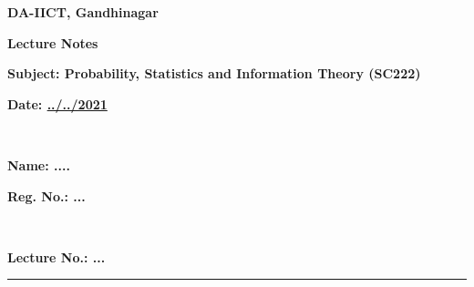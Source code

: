 \documentclass[a4paper,12pt]{article}
\theoremstyle{definition}
\begin{document}
\begin{minipage}[t]{\textwidth}%
  \centering
{\textbf{DA-IICT, Gandhinagar}}\par
  {\textbf{Lecture Notes}} \par
{\textbf{Subject: Probability, Statistics and Information Theory (SC222)}}
\end{minipage}
\par
\bigskip
\begin{minipage}[t]{.7\textwidth}%
  \textbf{Date: \underline{../../2021}} \par
  \textbf{~} \par
  \textbf{Name: ....} \par
\end{minipage}%
\hfill
\begin{minipage}[t]{.4\textwidth}%
  \textbf{Reg. No.: ...} \par
  \textbf{~} \par
  \textbf{Lecture No.: ...} \par

\end{minipage}
\vskip 0.5cm
\hrule
\thispagestyle{empty}
\end{document}
